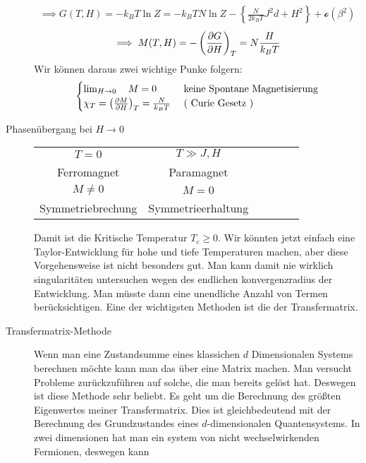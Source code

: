 \begin{description}
\begin{align*}
      \implies G(T, H) = - k_B T \ln{Z} = - k_B T N \ln{Z} - \left\{ \frac{N}{2 k_B T} J^2 d+  H^2 \right\} + \mathcal{o}(\beta^2)
    \end{align*}
    \begin{align*}
      \implies M(T, H) =  - \left( \frac{\partial G }{\partial H} \right)_T = N
      \frac{H}{k_B T}
    \end{align*}
    Wir können daraus zwei wichtige Punke folgern:
    \begin{align*}
      \begin{cases}
        \lim_{H\to 0} \quad M = 0 & \text{ keine Spontane Magnetisierung} \\
        \chi_T = \left( \frac{\partial M }{\partial H} \right)_T = \frac{N}{k_B T} & \text{ ( Curie Gesetz )}
      \end{cases} 
    \end{align*}
  \item[Phasenübergang bei $H\to0$]
    \begin{table}[h!]
      \centering
      \begin{tabular}{c c c c c c}
        $T = 0$ & $T \gg J, H$ \\
        Ferromagnet & Paramagnet \\
        $M \neq 0$  & $ M = 0$ \\
        Symmetriebrechung & Symmetrieerhaltung \\
      \end{tabular}
    \end{table}
    Damit ist die Kritische Temperatur $T_c \ge 0$. Wir könnten jetzt einfach
    eine Taylor-Entwicklung für hohe und tiefe Temperaturen machen, aber diese
    Vorgehensweise ist nicht besonders gut. Man kann damit nie wirklich
    singularitäten untersuchen wegen des endlichen konvergenzradius der Entwicklung.
    Man müsste dann eine unendliche Anzahl von Termen berücksichtigen. Eine 
    der wichtigsten Methoden ist die der Transfermatrix.
  \item[Transfermatrix-Methode] Wenn man eine Zustandsumme eines klassichen
    $d$ Dimensionalen Systems berechnen möchte kann man das über eine Matrix machen.
    Man versucht Probleme zurückzuführen auf solche, die man bereits gelöst hat.
    Deswegen ist diese Methode sehr beliebt. Es geht um die Berechnung des größten
    Eigenwertes meiner Transfermatrix. Dies ist gleichbedeutend mit der Berechnung
    des Grundzustandes eines $d$-dimensionalen Quantensystems. In zwei dimensionen
    hat man ein system von nicht wechselwirkenden Fermionen, deswegen kann 

\end{description}
